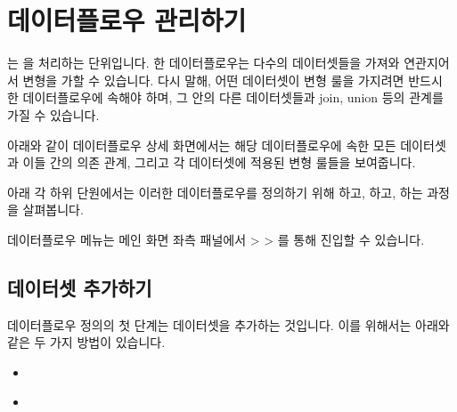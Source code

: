 \documentclass[letterpaper,10pt,english]{sphinxmanual}
\begin{document}
\section{데이터플로우 관리하기}
\label{\detokenize{discovery/part07/manage_dataflow:id1}}\label{\detokenize{discovery/part07/manage_dataflow::doc}}
는 을 처리하는 단위입니다. 한 데이터플로우는 다수의 데이터셋들을 가져와 연관지어서 변형을 가할 수 있습니다.
다시 말해, 어떤 데이터셋이 변형 룰을 가지려면 반드시 한 데이터플로우에 속해야 하며, 그 안의 다른 데이터셋들과 join, union 등의 관계를 가질 수 있습니다.

아래와 같이 데이터플로우 상세 화면에서는 해당 데이터플로우에 속한 모든 데이터셋과 이들 간의 의존 관계, 그리고 각 데이터셋에 적용된 변형 룰들을 보여줍니다.
\begin{quote}

\begin{figure}[H]
\centering

\noindent{}
\end{figure}
\end{quote}

아래 각 하위 단원에서는 이러한 데이터플로우를 정의하기 위해 하고, 하고, 하는 과정을 살펴봅니다.

데이터플로우 메뉴는 메인 화면 좌측 패널에서  \textgreater{}  \textgreater{} 를 통해 진입할 수 있습니다.
\begin{quote}

\begin{figure}[H]
\centering

\noindent{}
\end{figure}
\end{quote}


\subsection{데이터셋 추가하기}
\label{\detokenize{discovery/part07/add_datasets:id1}}\label{\detokenize{discovery/part07/add_datasets::doc}}
데이터플로우 정의의 첫 단계는 데이터셋을 추가하는 것입니다. 이를 위해서는 아래와 같은 두 가지 방법이 있습니다.
\begin{itemize}
\item {} 
{\hyperref[\detokenize{discovery/part07/add_datasets:dataflow-creation-first}]{}}

\item {} 
{\hyperref[\detokenize{discovery/part07/add_datasets:dataflow-from-dataset}]{}}

\end{itemize}
\end{document}

